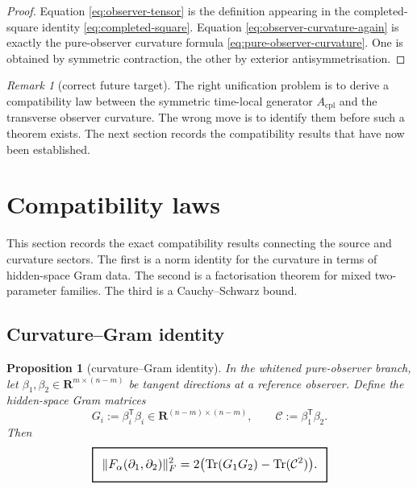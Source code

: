 \documentclass[11pt,a4paper]{article}
\numberwithin{equation}{section}
\DeclareMathOperator{\Tr}{Tr}
\newcommand{\R}{\mathbf R}
\newcommand{\geomboxed}[1]{%
  \setlength{\fboxsep}{8pt}%
  \setlength{\fboxrule}{0.9pt}%
  \fbox{\scalebox{1.10}{$\displaystyle #1$}}%
}
\theoremstyle{thmcompact}
\newtheorem{proposition}[theorem]{Proposition}
\theoremstyle{remark}
\newtheorem*{remarkplain}{Remark}
\newenvironment{remark}[1][]%
{\begin{remarkbox}\begin{remarkplain}[#1]\normalfont}
{\end{remarkplain}\end{remarkbox}}
\begin{document}
\begin{proof}
Equation \eqref{eq:observer-tensor} is the definition appearing in the completed-square identity \eqref{eq:completed-square}. Equation \eqref{eq:observer-curvature-again} is exactly the pure-observer curvature formula \eqref{eq:pure-observer-curvature}. One is obtained by symmetric contraction, the other by exterior antisymmetrisation.
\end{proof}

\begin{remark}[correct future target]
The right unification problem is to derive a compatibility law between the symmetric time-local generator $A_{\mathrm{cpl}}$ and the transverse observer curvature. The wrong move is to identify them before such a theorem exists. The next section records the compatibility results that have now been established.
\end{remark}

\section{Compatibility laws}

This section records the exact compatibility results connecting the source and curvature sectors. The first is a norm identity for the curvature in terms of hidden-space Gram data. The second is a factorisation theorem for mixed two-parameter families. The third is a Cauchy--Schwarz bound.

\subsection{Curvature--Gram identity}

\begin{proposition}[curvature--Gram identity]\label{prop:curvature-gram}
In the whitened pure-observer branch, let $\beta_1,\beta_2\in\R^{m\times(n-m)}$ be tangent directions at a reference observer. Define the hidden-space Gram matrices
\begin{equation}
G_i:=\beta_i^{\mathsf T}\beta_i\in\R^{(n-m)\times(n-m)},
\qquad
\mathcal C:=\beta_1^{\mathsf T}\beta_2.
\label{eq:gram-defs}
\end{equation}
Then
\begin{equation}
\geomboxed{\|F_\alpha(\partial_1,\partial_2)\|_F^2=2\bigl(\Tr(G_1G_2)-\Tr(\mathcal C^2)\bigr).}
\label{eq:curvature-gram}
\end{equation}
\end{proposition}
\end{document}
